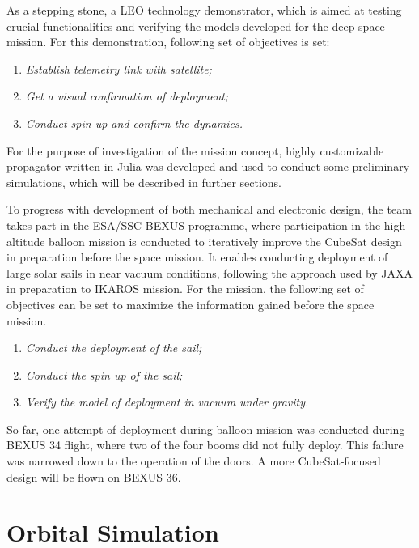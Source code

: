\documentclass[final,3p,times,twocolumn]{elsarticle}
\begin{document}
\noindent As a stepping stone, a LEO technology demonstrator, which is aimed at testing crucial functionalities and verifying the models developed for the deep space mission. For this demonstration, following set of objectives is set:

\begin{enumerate}
        \item \emph{Establish telemetry link with satellite;}
        \item \emph{Get a visual confirmation of deployment;}
        \item \emph{Conduct spin up and confirm the dynamics.}
    \end{enumerate}

\noindent For the purpose of investigation of the mission concept, highly customizable propagator written in Julia was developed and used to conduct some preliminary simulations, which will be described in further sections.
\vspace{5pt}
\par\noindent To progress with development of both mechanical and electronic design, the team takes part in the ESA/SSC BEXUS programme, where participation in the high-altitude balloon mission is conducted to iteratively improve the CubeSat design in preparation before the space mission. It enables conducting deployment of large solar sails in near vacuum conditions, following the approach used by JAXA in preparation to IKAROS mission. For the mission, the following set of objectives can be set to maximize the information gained before the space mission.

\begin{enumerate}
        \item \emph{Conduct the deployment of the sail;}
        \item \emph{Conduct the spin up of the sail;}
        \item \emph{Verify the model of deployment in vacuum under gravity.}
    \end{enumerate}

\noindent So far, one attempt of deployment during balloon mission was conducted during BEXUS 34 flight, where two of the four booms did not fully deploy. This failure was narrowed down to the operation of the doors. A more CubeSat-focused design will be flown on BEXUS 36. 
\section{Orbital Simulation}
\end{document}

